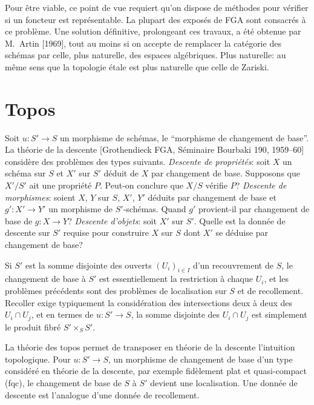 \documentclass[11pt,a4paper]{article}
\theoremstyle{plain}
\theoremstyle{definition}
\begin{document}
Pour \^etre viable, ce point de vue requiert qu'on dispose de m\'ethodes pour v\'erifier si un foncteur est repr\'esentable. La plupart des expos\'es de FGA sont consacr\'es \`a ce probl\`eme. Une solution d\'efinitive, prolongeant ces travaux, a \'et\'e obtenue par M.~Artin [1969], tout au moins si on accepte de remplacer la cat\'egorie des sch\'emas par celle, plus naturelle, des espaces alg\'ebriques. Plus naturelle: au m\^eme sens que la topologie \'etale est plus naturelle que celle de Zariski.

\section{Topos}

Soit $u \colon S' \to S$ un morphisme de sch\'emas, le ``morphisme de changement de base''. La th\'eorie de la descente [Grothendieck FGA, S\'eminaire Bourbaki 190, 1959--60] consid\`ere des probl\`emes des types suivants. \emph{Descente de propri\'et\'es}: soit $X$ un sch\'ema sur $S$ et $X'$ sur $S'$ d\'eduit de $X$ par changement de base. Supposons que $X'/S'$ ait une propri\'et\'e $P$. Peut-on conclure que $X/S$ v\'erifie $P$? \emph{Descente de morphismes}: soient $X$, $Y$ sur $S$, $X'$, $Y'$ d\'eduits par changement de base et $g' \colon X' \to Y'$ un morphisme de $S'$-sch\'emas. Quand $g'$ provient-il par changement de base de $g \colon X \to Y$? \emph{Descente d'objets}: soit $X'$ sur $S'$. Quelle est la donn\'ee de descente sur $S'$ requise pour construire $X$ sur $S$ dont $X'$ se d\'eduise par changement de base?

Si $S'$ est la somme disjointe des ouverts $(U_i)_{i \in I}$ d'un recouvrement de $S$, le changement de base \`a $S'$ est essentiellement la restriction \`a chaque $U_i$, et les probl\`emes pr\'ec\'edents sont des probl\`emes de localisation sur $S$ et de recollement. Recoller exige typiquement la consid\'eration des intersections deux \`a deux des $U_i \cap U_j$, et en termes de $u \colon S' \to S$, la somme disjointe des $U_i \cap U_j$ est simplement le produit fibr\'e $S' \times_S S'$.

La th\'eorie des topos permet de transposer en th\'eorie de la descente l'intuition topologique. Pour $u \colon S' \to S$, un morphisme de changement de base d'un type consid\'er\'e en th\'eorie de la descente, par exemple fid\`element plat et quasi-compact (fqc), le changement de base de $S$ \`a $S'$ devient une localisation. Une donn\'ee de descente est l'analogue d'une donn\'ee de recollement.
\end{document}
